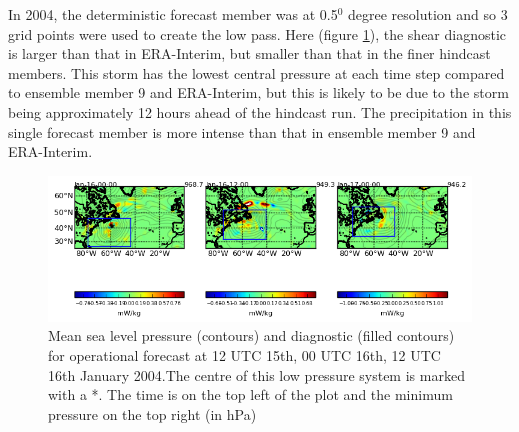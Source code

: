 In 2004, the deterministic forecast member was at 0.5$^0$ degree resolution and so 3 grid points were used to create the low pass. Here (figure \ref{fig:fc_diag}), the shear diagnostic is larger than that in ERA-Interim, but smaller than that in the finer hindcast members. This storm has the lowest central pressure at each time step compared to ensemble member 9 and ERA-Interim, but this is likely to be due to the storm being approximately 12 hours ahead of the hindcast run. The precipitation in this single forecast member is more intense than that in ensemble member 9 and ERA-Interim.

\begin{figure}
	\includegraphics[width=34pc,angle=0]{plot_var_poly_fc_diag500_msl_12UTC_15.png} %
	\caption{Mean sea level pressure (contours) and diagnostic (filled contours) for operational forecast at 12 UTC 15th, 00 UTC 16th, 12 UTC 16th January 2004.The centre of this low pressure system is marked with a *. The time is on the top left of the plot and the minimum pressure on the top right (in hPa)}\label{fig:fc_diag}
	\centering
\end{figure}

